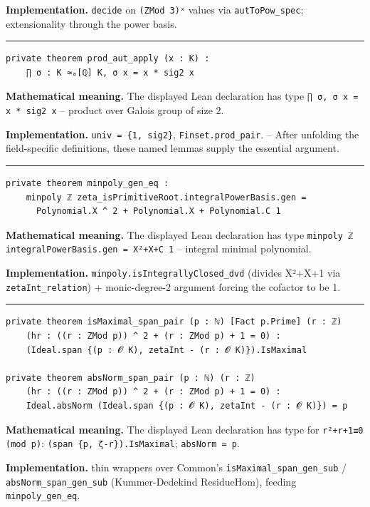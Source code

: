 \documentclass[UTF8,a4paper,11pt,fontset=fandol]{ctexart}
\theoremstyle{definition}
\newcommand{\statementsep}{\par\medskip\hrule\medskip}
\begin{document}
\noindent\textbf{Implementation.} \texttt{decide} on \texttt{(ZMod 3)ˣ} values via \texttt{autToPow\_\allowbreak{}spec}; extensionality through the power basis.\par
\statementsep
\begin{verbatim}
private theorem prod_aut_apply (x : K) :
    ∏ σ : K ≃ₐ[ℚ] K, σ x = x * sig2 x
\end{verbatim}
\noindent\textbf{Mathematical meaning.} The displayed Lean declaration has type \texttt{∏ σ, σ x = x * sig2 x} -- product over Galois group of size 2.\par
\noindent\textbf{Implementation.} \texttt{univ = \{1, sig2\}}, \texttt{Finset.\allowbreak{}prod\_\allowbreak{}pair}. -- After unfolding the field-specific definitions, these named lemmas supply the essential argument.\par
\statementsep
\begin{verbatim}
private theorem minpoly_gen_eq :
    minpoly ℤ zeta_isPrimitiveRoot.integralPowerBasis.gen =
      Polynomial.X ^ 2 + Polynomial.X + Polynomial.C 1
\end{verbatim}
\noindent\textbf{Mathematical meaning.} The displayed Lean declaration has type \texttt{minpoly ℤ integralPowerBasis.\allowbreak{}gen = X²+X+C 1} -- integral minimal polynomial.\par
\noindent\textbf{Implementation.} \texttt{minpoly.\allowbreak{}isIntegrallyClosed\_\allowbreak{}dvd} (divides X²+X+1 via \texttt{zetaInt\_\allowbreak{}relation}) + monic-degree-2 argument forcing the cofactor to be 1.\par
\statementsep
\begin{verbatim}
private theorem isMaximal_span_pair (p : ℕ) [Fact p.Prime] (r : ℤ)
    (hr : ((r : ZMod p)) ^ 2 + (r : ZMod p) + 1 = 0) :
    (Ideal.span {(p : 𝓞 K), zetaInt - (r : 𝓞 K)}).IsMaximal

private theorem absNorm_span_pair (p : ℕ) (r : ℤ)
    (hr : ((r : ZMod p)) ^ 2 + (r : ZMod p) + 1 = 0) :
    Ideal.absNorm (Ideal.span {(p : 𝓞 K), zetaInt - (r : 𝓞 K)}) = p
\end{verbatim}
\noindent\textbf{Mathematical meaning.} The displayed Lean declaration has type for \texttt{r²+r+1≡0 (mod p)}: \texttt{(span \{p, ζ-r\}).\allowbreak{}IsMaximal}; \texttt{absNorm = p}.\par
\noindent\textbf{Implementation.} thin wrappers over Common's \texttt{isMaximal\_\allowbreak{}span\_\allowbreak{}gen\_\allowbreak{}sub} / \texttt{absNorm\_\allowbreak{}span\_\allowbreak{}gen\_\allowbreak{}sub} (Kummer-Dedekind ResidueHom), feeding \texttt{minpoly\_\allowbreak{}gen\_\allowbreak{}eq}.\par
\end{document}
